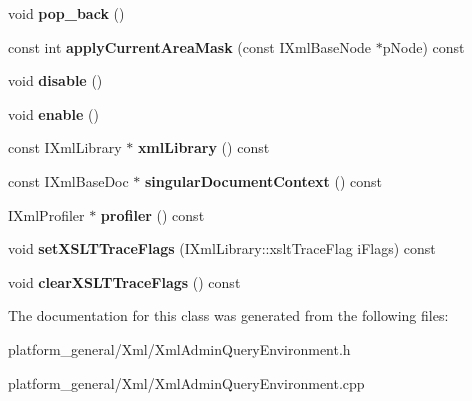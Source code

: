 \begin{DoxyCompactItemize}
\item 
\hypertarget{classgeneral__server_1_1XmlAdminQueryEnvironment_a0c6560acd06af4d1d71809d4882f961c}{void {\bfseries pop\-\_\-back} ()}\label{classgeneral__server_1_1XmlAdminQueryEnvironment_a0c6560acd06af4d1d71809d4882f961c}

\item 
\hypertarget{classgeneral__server_1_1XmlAdminQueryEnvironment_a551db042be1d17585ada51d2ba59d72d}{const int {\bfseries apply\-Current\-Area\-Mask} (const \-I\-Xml\-Base\-Node $\ast$p\-Node) const }\label{classgeneral__server_1_1XmlAdminQueryEnvironment_a551db042be1d17585ada51d2ba59d72d}

\item 
\hypertarget{classgeneral__server_1_1XmlAdminQueryEnvironment_a0325ae415142db7551e76d234708533d}{void {\bfseries disable} ()}\label{classgeneral__server_1_1XmlAdminQueryEnvironment_a0325ae415142db7551e76d234708533d}

\item 
\hypertarget{classgeneral__server_1_1XmlAdminQueryEnvironment_a388bf0e783cfcce8d0e22bbc8c9090c6}{void {\bfseries enable} ()}\label{classgeneral__server_1_1XmlAdminQueryEnvironment_a388bf0e783cfcce8d0e22bbc8c9090c6}

\item 
\hypertarget{classgeneral__server_1_1XmlAdminQueryEnvironment_a0540f147089f0d38042e242ebf50efee}{const \-I\-Xml\-Library $\ast$ {\bfseries xml\-Library} () const }\label{classgeneral__server_1_1XmlAdminQueryEnvironment_a0540f147089f0d38042e242ebf50efee}

\item 
\hypertarget{classgeneral__server_1_1XmlAdminQueryEnvironment_a3da890d71daa97f3e4aa4aa7a8eded70}{const \-I\-Xml\-Base\-Doc $\ast$ {\bfseries singular\-Document\-Context} () const }\label{classgeneral__server_1_1XmlAdminQueryEnvironment_a3da890d71daa97f3e4aa4aa7a8eded70}

\item 
\hypertarget{classgeneral__server_1_1XmlAdminQueryEnvironment_ad6b94f49ee03cab5d652fce55091a5ee}{\-I\-Xml\-Profiler $\ast$ {\bfseries profiler} () const }\label{classgeneral__server_1_1XmlAdminQueryEnvironment_ad6b94f49ee03cab5d652fce55091a5ee}

\item 
\hypertarget{classgeneral__server_1_1XmlAdminQueryEnvironment_a620418e6b2324175f7a954898e03312a}{void {\bfseries set\-X\-S\-L\-T\-Trace\-Flags} (\-I\-Xml\-Library\-::xslt\-Trace\-Flag i\-Flags) const }\label{classgeneral__server_1_1XmlAdminQueryEnvironment_a620418e6b2324175f7a954898e03312a}

\item 
\hypertarget{classgeneral__server_1_1XmlAdminQueryEnvironment_afa1655adb2f18586b40b19df393d8212}{void {\bfseries clear\-X\-S\-L\-T\-Trace\-Flags} () const }\label{classgeneral__server_1_1XmlAdminQueryEnvironment_afa1655adb2f18586b40b19df393d8212}

\end{DoxyCompactItemize}


\-The documentation for this class was generated from the following files\-:\begin{DoxyCompactItemize}
\item 
platform\-\_\-general/\-Xml/\-Xml\-Admin\-Query\-Environment.\-h\item 
platform\-\_\-general/\-Xml/\-Xml\-Admin\-Query\-Environment.\-cpp\end{DoxyCompactItemize}
